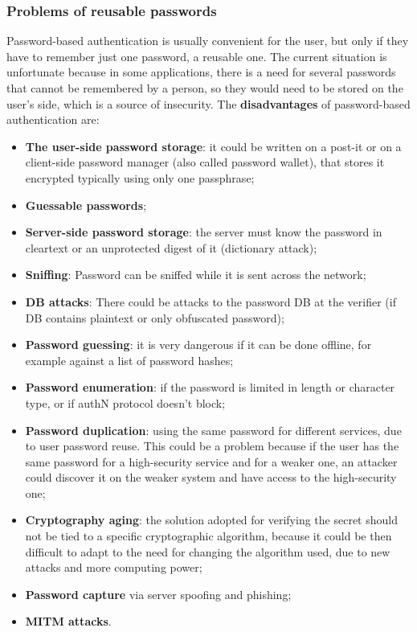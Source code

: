 \subsubsection{Problems of reusable passwords}
Password-based authentication is usually convenient for the user, but only if they have to remember just one password, a reusable one. The current situation is unfortunate because in some applications, there is a need for several passwords that cannot be remembered by a person, so they would need to be stored on the user's side, which is a source of insecurity. The \textbf{disadvantages} of password-based authentication are:
\begin{itemize}
	\item \textbf{The user-side password storage}: it could be written on a post-it or on a client-side password manager (also called password wallet), that stores it encrypted typically using only one passphrase;
	\item \textbf{Guessable passwords};
	\item \textbf{Server-side password storage}: the server must know the password in cleartext or an unprotected digest of it (dictionary attack);
	\item \textbf{Sniffing}: Password can be sniffed while it is sent across the network;
	\item \textbf{DB attacks}: There could be attacks to the password DB at the verifier (if DB contains plaintext or only obfuscated password);
	\item \textbf{Password guessing}: it is very dangerous if it can be done offline, for example against a list of password hashes;
	\item \textbf{Password enumeration}: if the password is limited in length or character type, or if authN protocol doesn't block;
	\item \textbf{Password duplication}: using the same password for different services, due to user password reuse. This could be a problem because if the user has the same password for a high-security service and for a weaker one, an attacker could discover it on the weaker system and have access to the high-security one;
	\item \textbf{Cryptography aging}: the solution adopted for verifying the secret should not be tied to a specific cryptographic algorithm, because it could be then difficult to adapt to the need for changing the algorithm used, due to new attacks and more computing power;
	\item \textbf{Password capture} via server spoofing and phishing;
	\item \textbf{MITM attacks}.
\end{itemize}



